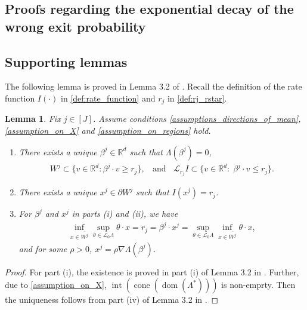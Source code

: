 \documentclass[aap,preprint]{imsart}
\newcommand{\bR}{{\mathbb{R}}}
\theoremstyle{plain}
\newtheorem{lemma}[theorem]{Lemma}
\theoremstyle{definition}
\begin{document}
\begin{appendix}
\section{Proofs regarding the exponential decay of the wrong exit probability}

\subsection{Supporting lemmas}
The following lemma is proved in Lemma 3.2 of \cite{collamore2002}. Recall the definition of the rate function $I(\cdot)$ in \eqref{def:rate_function} and $r_j$ in \eqref{def:rj_rstar}.


\begin{lemma}\label{app_lemma:upper_bound_var_single_j}
Fix $j \in [J]$.  Assume conditions \eqref{assumptions_directions_of_mean},  \eqref{assumption_on_X} and \eqref{assumption_on_regions} hold. 
\begin{enumerate}[label=(\roman*)]
    \item 
There exists a unique $\beta^j \in \bR^d$ such that $\Lambda(\beta^j) = 0$,
\begin{align*}
    W^j \subset \{v\in \bR^{d}: \beta^j \cdot v \geq r_j\},\;\; \text{ and } \;\; \mathcal{L}_{r_j} I \subset \{v \in \bR^{d}:\; \beta^j \cdot v \leq r_j\}.
\end{align*}

\item There exists a unique $x^j \in \partial W^{j}$ such that $I(x^j) = r_j$.

\item For $\beta^j$ and $x^j$ in parts (i) and (ii), we have
\begin{align*}
    \inf_{x \in \overline{W^j}} \sup_{\theta \in \mathcal{L}_0 \Lambda} \theta \cdot x = r_j = \beta^j \cdot x^j = \sup_{\theta \in \mathcal{L}_0 \Lambda} \inf_{x \in \overline{W^j}} \theta \cdot x,
\end{align*}
and for some $\rho > 0$, $x^j = \rho \nabla \Lambda(\beta^j)$.
\end{enumerate}
\end{lemma}

\begin{proof}
For part (i), the existence is proved in part (i) of Lemma 3.2 in \cite{collamore2002}. Further, due to \eqref{assumption_on_X}, $\operatorname{int}\left(\operatorname{cone}\left( \operatorname{dom}(\Lambda^*)\right)\right)$ is non-emprty. Then the uniqueness follows from part (iv) of Lemma 3.2 in \cite{collamore2002}.


\end{proof}
\end{appendix}
\end{document}
